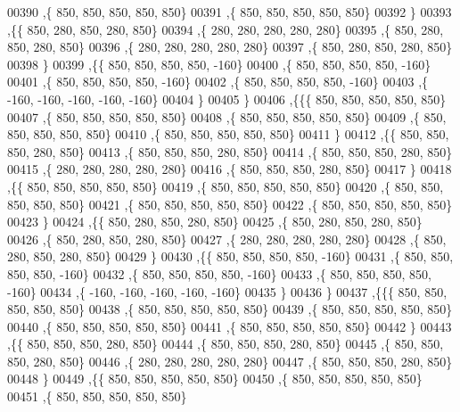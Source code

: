\begin{DoxyCode}
00390    ,\{   850,   850,   850,   850,   850\}
00391    ,\{   850,   850,   850,   850,   850\}
00392    \}
00393   ,\{\{   850,   280,   850,   280,   850\}
00394    ,\{   280,   280,   280,   280,   280\}
00395    ,\{   850,   280,   850,   280,   850\}
00396    ,\{   280,   280,   280,   280,   280\}
00397    ,\{   850,   280,   850,   280,   850\}
00398    \}
00399   ,\{\{   850,   850,   850,   850,  -160\}
00400    ,\{   850,   850,   850,   850,  -160\}
00401    ,\{   850,   850,   850,   850,  -160\}
00402    ,\{   850,   850,   850,   850,  -160\}
00403    ,\{  -160,  -160,  -160,  -160,  -160\}
00404    \}
00405   \}
00406  ,\{\{\{   850,   850,   850,   850,   850\}
00407    ,\{   850,   850,   850,   850,   850\}
00408    ,\{   850,   850,   850,   850,   850\}
00409    ,\{   850,   850,   850,   850,   850\}
00410    ,\{   850,   850,   850,   850,   850\}
00411    \}
00412   ,\{\{   850,   850,   850,   280,   850\}
00413    ,\{   850,   850,   850,   280,   850\}
00414    ,\{   850,   850,   850,   280,   850\}
00415    ,\{   280,   280,   280,   280,   280\}
00416    ,\{   850,   850,   850,   280,   850\}
00417    \}
00418   ,\{\{   850,   850,   850,   850,   850\}
00419    ,\{   850,   850,   850,   850,   850\}
00420    ,\{   850,   850,   850,   850,   850\}
00421    ,\{   850,   850,   850,   850,   850\}
00422    ,\{   850,   850,   850,   850,   850\}
00423    \}
00424   ,\{\{   850,   280,   850,   280,   850\}
00425    ,\{   850,   280,   850,   280,   850\}
00426    ,\{   850,   280,   850,   280,   850\}
00427    ,\{   280,   280,   280,   280,   280\}
00428    ,\{   850,   280,   850,   280,   850\}
00429    \}
00430   ,\{\{   850,   850,   850,   850,  -160\}
00431    ,\{   850,   850,   850,   850,  -160\}
00432    ,\{   850,   850,   850,   850,  -160\}
00433    ,\{   850,   850,   850,   850,  -160\}
00434    ,\{  -160,  -160,  -160,  -160,  -160\}
00435    \}
00436   \}
00437  ,\{\{\{   850,   850,   850,   850,   850\}
00438    ,\{   850,   850,   850,   850,   850\}
00439    ,\{   850,   850,   850,   850,   850\}
00440    ,\{   850,   850,   850,   850,   850\}
00441    ,\{   850,   850,   850,   850,   850\}
00442    \}
00443   ,\{\{   850,   850,   850,   280,   850\}
00444    ,\{   850,   850,   850,   280,   850\}
00445    ,\{   850,   850,   850,   280,   850\}
00446    ,\{   280,   280,   280,   280,   280\}
00447    ,\{   850,   850,   850,   280,   850\}
00448    \}
00449   ,\{\{   850,   850,   850,   850,   850\}
00450    ,\{   850,   850,   850,   850,   850\}
00451    ,\{   850,   850,   850,   850,   850\}

\end{DoxyCode}

